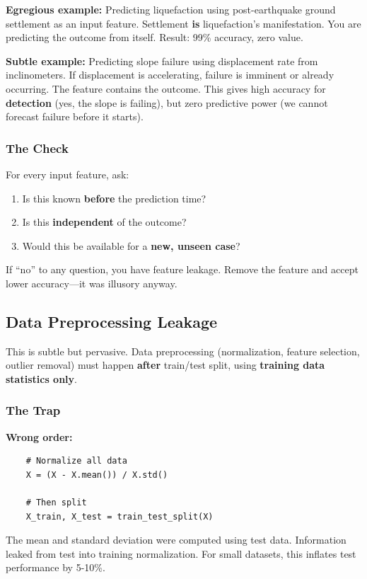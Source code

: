 \documentclass[12pt]{article}
\begin{document}
\textbf{Egregious example:}
Predicting liquefaction using post-earthquake ground settlement as an input feature. Settlement \textbf{is} liquefaction's manifestation. You are predicting the outcome from itself. Result: 99\% accuracy, zero value.

\textbf{Subtle example:}
Predicting slope failure using displacement rate from inclinometers. If displacement is accelerating, failure is imminent or already occurring. The feature contains the outcome. This gives high accuracy for \textbf{detection} (yes, the slope is failing), but zero predictive power (we cannot forecast failure before it starts).

\subsubsection{The Check}

For every input feature, ask:
\begin{enumerate}
	\item Is this known \textbf{before} the prediction time?
	\item Is this \textbf{independent} of the outcome?
	\item Would this be available for a \textbf{new, unseen case}?
\end{enumerate}

If ``no'' to any question, you have feature leakage. Remove the feature and accept lower accuracy---it was illusory anyway.

\subsection{Data Preprocessing Leakage}

This is subtle but pervasive. Data preprocessing (normalization, feature selection, outlier removal) must happen \textbf{after} train/test split, using \textbf{training data statistics only}.

\subsubsection{The Trap}

\textbf{Wrong order:}
\begin{lstlisting}
	# Normalize all data
	X = (X - X.mean()) / X.std()
	
	# Then split
	X_train, X_test = train_test_split(X)
\end{lstlisting}

The mean and standard deviation were computed using test data. Information leaked from test into training normalization. For small datasets, this inflates test performance by 5-10\%.
\end{document}

